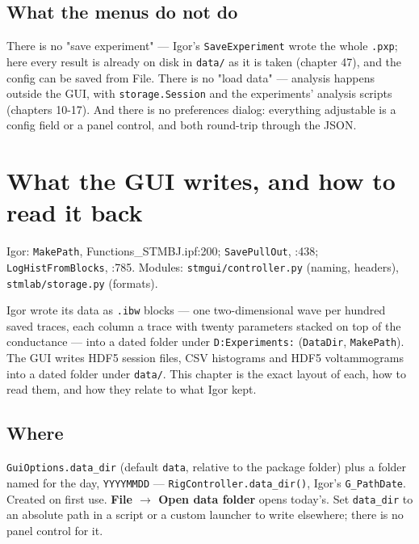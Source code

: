 \section{What the menus do not do}

There is no "save experiment" --- Igor's \texttt{Save\discretionary{}{}{}Experiment} wrote the whole \texttt{.\discretionary{}{}{}pxp}; here every result is already on disk in \texttt{data/\discretionary{}{}{}} as it is taken (chapter 47), and the config can be saved from File. There is no "load data" --- analysis happens outside the GUI, with \texttt{storage.\discretionary{}{}{}Session} and the experiments' analysis scripts (chapters 10-17). And there is no preferences dialog: everything adjustable is a config field or a panel control, and both round-trip through the JSON.

\setcounter{chapter}{46}
\chapter{What the GUI writes, and how to read it back}

\begin{keybox}\small Igor: \texttt{Make\discretionary{}{}{}Path}, Functions\_STMBJ.ipf:200; \texttt{Save\discretionary{}{}{}Pull\discretionary{}{}{}Out}, :438; \texttt{Log\discretionary{}{}{}Hist\discretionary{}{}{}From\discretionary{}{}{}Blocks}, :785. Modules: \texttt{stmgui/\discretionary{}{}{}controller.\discretionary{}{}{}py} (naming, headers), \texttt{stmlab/\discretionary{}{}{}storage.\discretionary{}{}{}py} (formats).\end{keybox}

Igor wrote its data as \texttt{.\discretionary{}{}{}ibw} blocks --- one two-dimensional wave per hundred saved traces, each column a trace with twenty parameters stacked on top of the conductance --- into a dated folder under \texttt{D:Experiments:} (\texttt{Data\discretionary{}{}{}Dir}, \texttt{Make\discretionary{}{}{}Path}). The GUI writes HDF5 session files, CSV histograms and HDF5 voltammograms into a dated folder under \texttt{data/\discretionary{}{}{}}. This chapter is the exact layout of each, how to read them, and how they relate to what Igor kept.

\section{Where}

\texttt{Gui\discretionary{}{}{}Options.\discretionary{}{}{}data\_\discretionary{}{}{}dir} (default \texttt{data}, relative to the package folder) plus a folder named for the day, \texttt{YYYYMMDD} --- \texttt{Rig\discretionary{}{}{}Controller.\discretionary{}{}{}data\_\discretionary{}{}{}dir()}, Igor's \texttt{G\_\discretionary{}{}{}Path\discretionary{}{}{}Date}. Created on first use. \textbf{File $\rightarrow$ Open data folder} opens today's. Set \texttt{data\_\discretionary{}{}{}dir} to an absolute path in a script or a custom launcher to write elsewhere; there is no panel control for it.

